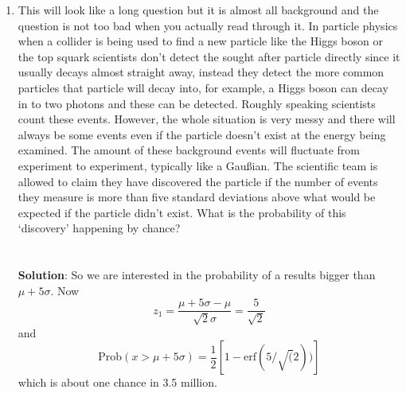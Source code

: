 \documentclass[11pt,a4paper]{scrartcl}
\begin{document}
\begin{enumerate}

  
\item This will look like a long question but it is almost all
  background and the question is not too bad when you actually read
  through it. In particle physics when a collider is being used to
  find a new particle like the Higgs boson or the top squark
  scientists don't detect the sought after particle directly since it
  usually decays almost straight away, instead they detect the more
  common particles that particle will decay into, for example, a Higgs
  boson can decay in to two photons and these can be detected. Roughly
  speaking scientists count these events. However, the whole situation
  is very messy and there will always be some events even if the
  particle doesn't exist at the energy being examined. The amount of
  these background events will fluctuate from experiment to
  experiment, typically like a Gau\ss{}ian. The scientific team is
  allowed to claim they have discovered the particle if the number of
  events they measure is more than five standard deviations above
  what would be expected if the particle didn't exist. What is the
  probability of this \lq{}discovery\rq{} happening by chance?
  \\ \\ \\ \textbf{Solution}: So we are interested in the probability of a results bigger than $\mu+5\sigma$. Now
\begin{equation}
z_1=\frac{\mu+5\sigma-\mu}{\sqrt{2}\sigma}=\frac{5}{\sqrt{2}}
\end{equation}
and
\begin{equation}
\mbox{Prob}(x>\mu+5\sigma)=\frac{1}{2}[1-\mbox{erf}(5/\sqrt(2))]
\end{equation}
which is about one chance in 3.5 million.
    

\end{enumerate}
\end{document}
